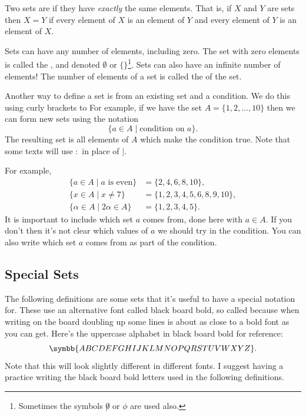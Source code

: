 \documentclass[fleqn]{LectureClass/LectureClass}
\begin{document}
    Two sets are  if they have \emph{exactly} the same elements.
    That is, if \(X\) and \(Y\) are sets then \(X = Y\) if every element of \(X\) is an element of \(Y\) and every element of \(Y\) is an element of \(X\).
    
    Sets can have any number of elements, including zero.
    The set with zero elements is called the , and denoted \(\emptyset\) or \(\{\}\)\footnote{Sometimes the symbols \(\not0\) or \(\phi\) are used also.}.
    Sets can also have an infinite number of elements!
    The number of elements of a set is called the  of the set.
    
    Another way to define a set is from an existing set and a condition.
    We do this using curly brackets to 
    For example, if we have the set \(A = \{1, 2, \dotsc, 10\}\) then we can form new sets using the notation
    \begin{equation}
        \{a \in A \mid \text{condition on } a\}.
    \end{equation}
    The resulting set is all elements of \(A\) which make the condition true.
    Note that some texts will use \(:\) in place of \(\mid\).
    
    For example,
    \begin{align}
        \{a \in A \mid a \text{ is even}\} &= \{2, 4, 6, 8, 10\},\\
        \{x \in A \mid x \ne 7\} &= \{1, 2, 3, 4, 5, 6, 8, 9, 10\},\\
        \{\alpha \in A \mid 2\alpha \in A\} &= \{1, 2, 3, 4, 5\}.
    \end{align}
    It is important to include which set \(a\) comes from, done here with \(a \in A\).
    If you don't then it's not clear which values of \(a\) we should try in the condition.
    You can also write which set \(a\) comes from as part of the condition.
    
    \subsection{Special Sets}
    The following definitions are some sets that it's useful to have a special notation for.
    These use an alternative font called black board bold, so called because when writing on the board doubling up some lines is about as close to a bold font as you can get.
    Here's the uppercase alphabet in black board bold for reference:
    \begin{equation}
        \symbb{ABCDEFGHIJKLMNOPQRSTUVWXYZ}.
    \end{equation}
    Note that this will look slightly different in different fonts.
    I suggest having a practice writing the black board bold letters used in the following definitions.
    
\end{document}
